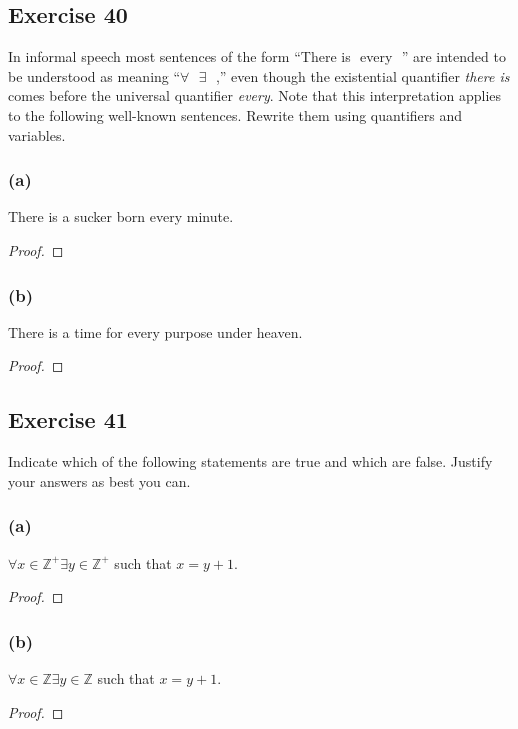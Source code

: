 \documentclass[14pt]{extarticle}
\newcommand{\fbl}{\underline{\hspace{1cm}}\,\,}
\newcommand{\Z}{\mathbb{Z}}
\newcommand{\fa}{\forall}
\newcommand{\te}{\exists}
\begin{document}
\subsection{Exercise 40}
In informal speech most sentences of the form “There is \fbl every \fbl” are intended to be understood as meaning “$\fa$ \fbl $\te$ \fbl,” even though the existential quantifier {\it there is} comes before the universal quantifier {\it every}. Note that this interpretation applies to the following well-known sentences. Rewrite them using quantifiers and variables.

\subsubsection{(a)}
There is a sucker born every minute.

\begin{proof}

\end{proof}

\subsubsection{(b)}
There is a time for every purpose under heaven.

\begin{proof}

\end{proof}

\subsection{Exercise 41}
Indicate which of the following statements are true and which are false. Justify your answers as best you can.

\subsubsection{(a)}
$\fa x \in \Z^+ \te y \in \Z^+$ such that $x = y + 1$.

\begin{proof}

\end{proof}

\subsubsection{(b)}
$\fa x \in \Z \te y \in \Z$ such that $x = y + 1$.

\begin{proof}

\end{proof}
\end{document}
